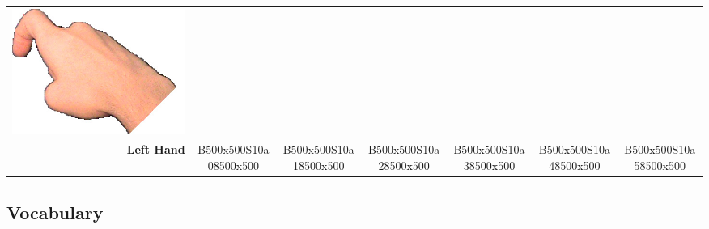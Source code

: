 \documentclass{article}
\begin{document}
\begin{center}
\begin{tabular}{r*{6}{c}}
\includegraphics[scale=0.1]{images/01-05-6.jpg}\\
\textbf{Left Hand}&
B500x500S10a08500x500&
B500x500S10a18500x500&
B500x500S10a28500x500&
B500x500S10a38500x500&
B500x500S10a48500x500&
B500x500S10a58500x500\\
\end{tabular}
\end{center}

\subsection{Vocabulary}
\end{document}
